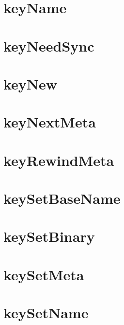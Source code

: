 \let\mypdfximage\pdfximage\def\pdfximage{\immediate\mypdfximage}\documentclass[twoside]{book}
\newcommand{\+}{\discretionary{\mbox{\scriptsize$\hookleftarrow$}}{}{}}
\begin{document}
\chapter{key\+Name}
\label{doc_api_review_core_keyName_md}

\chapter{key\+Need\+Sync}
\label{doc_api_review_core_keyNeedSync_md}

\chapter{key\+New}
\label{doc_api_review_core_keyNew_md}

\chapter{key\+Next\+Meta}
\label{doc_api_review_core_keyNextMeta_md}

\chapter{key\+Rewind\+Meta}
\label{doc_api_review_core_keyRewindMeta_md}

\chapter{key\+Set\+Base\+Name}
\label{doc_api_review_core_keySetBaseName_md}

\chapter{key\+Set\+Binary}
\label{doc_api_review_core_keySetBinary_md}

\chapter{key\+Set\+Meta}
\label{doc_api_review_core_keySetMeta_md}

\chapter{key\+Set\+Name}
\label{doc_api_review_core_keySetName_md}

\end{document}
